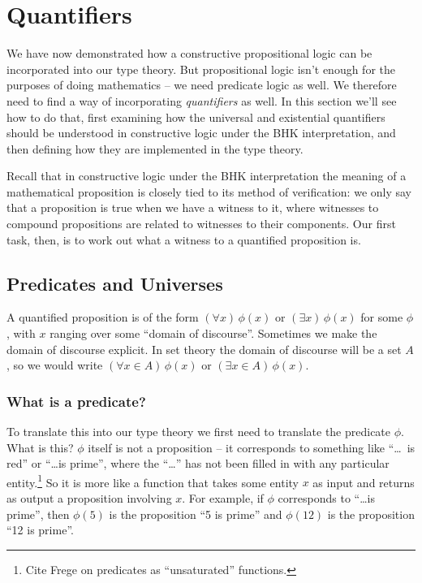 \section{Quantifiers}
\label{sec:Quantifiers}

We have now demonstrated how a constructive propositional logic can be incorporated into our type theory.  But propositional logic isn't enough for the purposes of doing mathematics -- we need predicate logic as well.  We therefore need to find a way of incorporating \emph{quantifiers} as well.  In this section we'll see how to do that, first examining how the universal and existential quantifiers should be understood in constructive logic under the BHK interpretation, and then defining how they are implemented in the type theory.

Recall that in constructive logic under the BHK interpretation the meaning of a mathematical proposition is closely tied to its method of verification: we only say that a proposition is true when we have a witness to it, where witnesses to compound propositions are related to witnesses to their components.  Our first task, then, is to work out what a witness to a quantified proposition is.  


\subsection{Predicates and Universes}
\label{sec:Quantifiers-PredicatesUniverses}

A quantified proposition is of the form 
$(\forall x)\, \phi(x)$ or  
$(\exists x)\, \phi(x)$ 
for some  $\phi$, with $x$ ranging over some ``domain of discourse''.  Sometimes we make the domain of discourse explicit.  In set theory the domain of discourse will be a set $A$, so we would write 
$(\forall x \in A)\, \phi(x)$ or 
$(\exists x \in A)\, \phi(x)$.

\subsubsection{What is a predicate?}
\label{sec:Quantifiers-WhatIsAPredicate}

To translate this into our type theory we first need to translate the predicate $\phi$.  What is this?  $\phi$ itself is not a proposition -- it corresponds to something like ``\ldots~is red'' or ``\ldots is prime'', where the ``\ldots'' has not been filled in with any particular entity.\footnote{
Cite Frege on predicates as ``unsaturated'' functions.
}  
So it is more like a function that takes some entity $x$ as input and returns as output a proposition involving $x$.  For example, if $\phi$ corresponds to ``\ldots is prime'', then $\phi(5)$ is the proposition ``5 is prime'' and $\phi(12)$ is the proposition ``12 is prime''.

